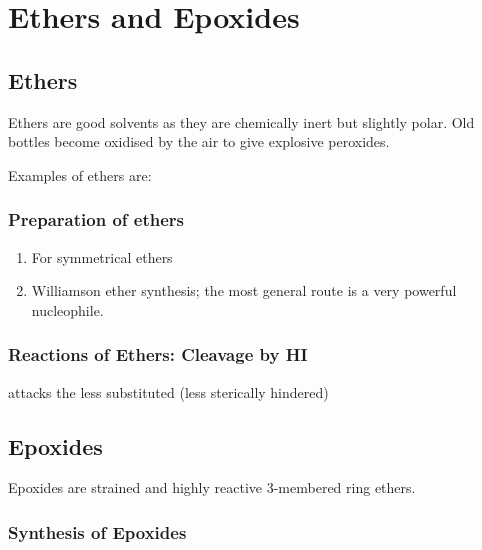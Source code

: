 \section{Ethers and Epoxides}

\subsection{Ethers}

Ethers are good solvents as they are chemically inert but slightly polar. Old
bottles become oxidised by the air to give explosive peroxides.

Examples of ethers are:


\subsubsection{Preparation of ethers}

\begin{enumerate}[label=\alph*)]

	\item For symmetrical ethers

	\item Williamson ether synthesis; the most general route
		 is a very powerful nucleophile.

\end{enumerate}

\subsubsection{Reactions of Ethers: Cleavage by HI}

 attacks the less substituted (less sterically hindered) 


\subsection{Epoxides}

Epoxides are strained and highly reactive 3-membered ring ethers.

\subsubsection{Synthesis of Epoxides}

